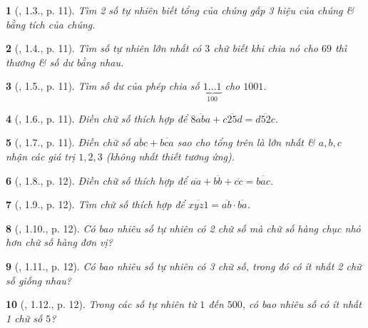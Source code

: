 \documentclass{article}
\newtheorem{baitoan}{}
\begin{document}
\begin{baitoan}[\cite{TLCT_THCS_Toan_6_so_hoc}, 1.3., p. 11]
	Tìm 2 số tự nhiên biết tổng của chúng gấp 3 hiệu của chúng \& bằng tích của chúng.
\end{baitoan}

\begin{baitoan}[\cite{TLCT_THCS_Toan_6_so_hoc}, 1.4., p. 11]
	Tìm số tự nhiên lớn nhất có $3$ chữ biết khi chia nó cho $69$ thì thương \& số dư bằng nhau.
\end{baitoan}

\begin{baitoan}[\cite{TLCT_THCS_Toan_6_so_hoc}, 1.5., p. 11]
	Tìm số dư của phép chia số $\underbrace{1\ldots1}_{100}$ cho $1001$.
\end{baitoan}

\begin{baitoan}[\cite{TLCT_THCS_Toan_6_so_hoc}, 1.6., p. 11]
	Điền chữ số thích hợp để $\overline{8aba} + \overline{c25d} = \overline{d52c}$.
\end{baitoan}

\begin{baitoan}[\cite{TLCT_THCS_Toan_6_so_hoc}, 1.7., p. 11]
	Điền chữ số $\overline{abc} + \overline{bca}$ sao cho tổng trên là lớn nhất \& $a,b,c$ nhận các giá trị $1,2,3$ (không nhất thiết tương ứng).
\end{baitoan}

\begin{baitoan}[\cite{TLCT_THCS_Toan_6_so_hoc}, 1.8., p. 12]
	Điền chữ số thích hợp để $\overline{aa} + \overline{bb} + \overline{cc} = \overline{bac}$.
\end{baitoan}

\begin{baitoan}[\cite{TLCT_THCS_Toan_6_so_hoc}, 1.9., p. 12]
	Tìm chữ số thích hợp để $\overline{xyz1} = \overline{ab}\cdot\overline{ba}$.
\end{baitoan}

\begin{baitoan}[\cite{TLCT_THCS_Toan_6_so_hoc}, 1.10., p. 12]
	Có bao nhiêu số tự nhiên có 2 chữ số mà chữ số hàng chục nhỏ hơn chữ số hàng đơn vị?
\end{baitoan}

\begin{baitoan}[\cite{TLCT_THCS_Toan_6_so_hoc}, 1.11., p. 12]
	Có bao nhiêu số tự nhiên có 3 chữ số, trong đó có ít nhất 2 chữ số giống nhau?
\end{baitoan}

\begin{baitoan}[\cite{TLCT_THCS_Toan_6_so_hoc}, 1.12., p. 12]
	Trong các số tự nhiên từ $1$ đến $500$, có bao nhiêu số có ít nhất 1 chữ số $5$?
\end{baitoan}
\end{document}
